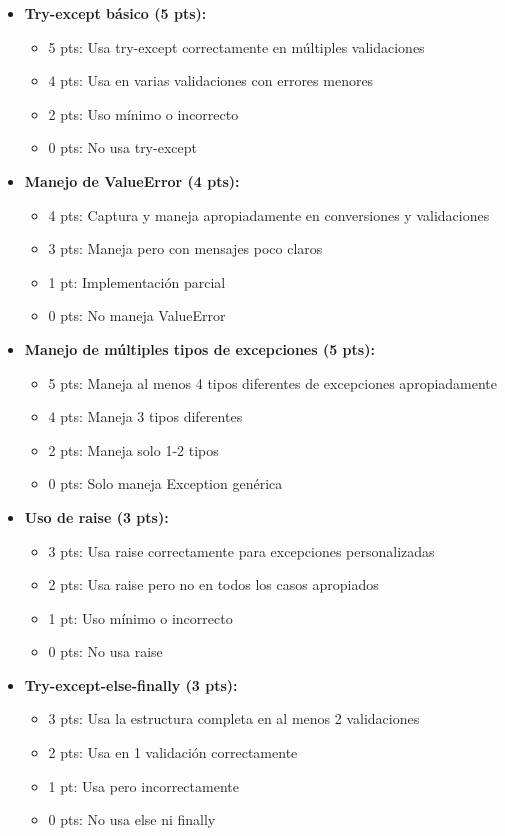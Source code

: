 \documentclass[12pt,a4paper]{article}
\begin{document}
\begin{itemize}[leftmargin=*]
    \item \textbf{Try-except básico (5 pts):}
    \begin{itemize}
        \item 5 pts: Usa try-except correctamente en múltiples validaciones
        \item 4 pts: Usa en varias validaciones con errores menores
        \item 2 pts: Uso mínimo o incorrecto
        \item 0 pts: No usa try-except
    \end{itemize}
    
    \item \textbf{Manejo de ValueError (4 pts):}
    \begin{itemize}
        \item 4 pts: Captura y maneja apropiadamente en conversiones y validaciones
        \item 3 pts: Maneja pero con mensajes poco claros
        \item 1 pt: Implementación parcial
        \item 0 pts: No maneja ValueError
    \end{itemize}
    
    \item \textbf{Manejo de múltiples tipos de excepciones (5 pts):}
    \begin{itemize}
        \item 5 pts: Maneja al menos 4 tipos diferentes de excepciones apropiadamente
        \item 4 pts: Maneja 3 tipos diferentes
        \item 2 pts: Maneja solo 1-2 tipos
        \item 0 pts: Solo maneja Exception genérica
    \end{itemize}
    
    \item \textbf{Uso de raise (3 pts):}
    \begin{itemize}
        \item 3 pts: Usa raise correctamente para excepciones personalizadas
        \item 2 pts: Usa raise pero no en todos los casos apropiados
        \item 1 pt: Uso mínimo o incorrecto
        \item 0 pts: No usa raise
    \end{itemize}
    
    \item \textbf{Try-except-else-finally (3 pts):}
    \begin{itemize}
        \item 3 pts: Usa la estructura completa en al menos 2 validaciones
        \item 2 pts: Usa en 1 validación correctamente
        \item 1 pt: Usa pero incorrectamente
        \item 0 pts: No usa else ni finally
    \end{itemize}
\end{itemize}
\end{document}
